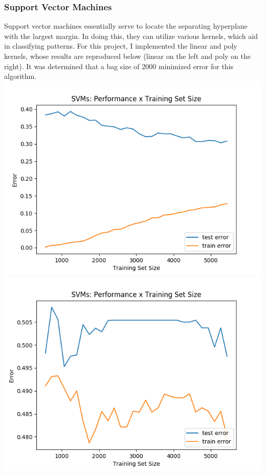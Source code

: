 \documentclass[11pt, a4paper]{article} %
\begin{document}
\subsubsection{Support Vector Machines}
Support vector machines essentially serve to locate the separating hyperplane with the largest margin. In doing this, they can utilize various kernels, which aid in classifying patterns. For this project, I implemented the linear and poly kernels, whose results are reproduced below (linear on the left and poly on the right). It was determined that a bag size of 2000 minimized error for this algorithm. 
\includegraphics[scale=0.525]{Linear.png}
\includegraphics[scale=0.525]{Poly.png}
\end{document}
